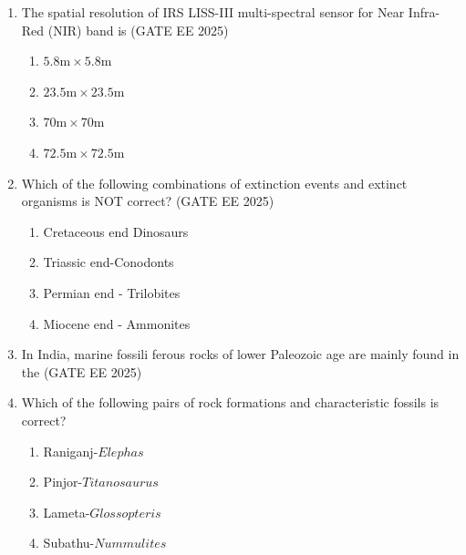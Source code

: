 \documentclass[journal]{IEEEtran}
\begin{document}
\begin{enumerate}[start=1]
\begin{enumerate}
\end{enumerate}
\item The spatial resolution of IRS LISS-III multi-spectral sensor for Near Infra-Red (NIR) band is
\hfill{(GATE EE 2025)}\\
\begin{enumerate}
    \item $5.8\text{m}\times 5.8\text{m}$ 
    \item $23.5\text{m}\times 23.5\text{m}$
    \item $70\text{m}\times 70\text{m}$
    \item $72.5\text{m}\times 72.5\text{m}$ 
\end{enumerate}

\item Which of the following combinations of extinction events and extinct organisms is NOT correct?
\hfill{(GATE EE 2025)}\\
\begin{enumerate}
    \item Cretaceous end Dinosaurs
    \item Triassic end-Conodonts
    \item Permian end - Trilobites
    \item Miocene end - Ammonites
\end{enumerate}
\item In India, marine fossili ferous rocks of lower Paleozoic age are mainly found in the
\hfill{(GATE EE 2025)}\\
\begin{enumerate}
\end{enumerate}

\item Which of the following pairs of rock formations and characteristic fossils is correct?
\begin{enumerate}
    \item Raniganj-$Elephas$
    \item Pinjor-$Titanosaurus$
    \item Lameta-$Glossopteris$
    \item Subathu-$Nummulites$
\end{enumerate}


\end{enumerate}
\end{document}
